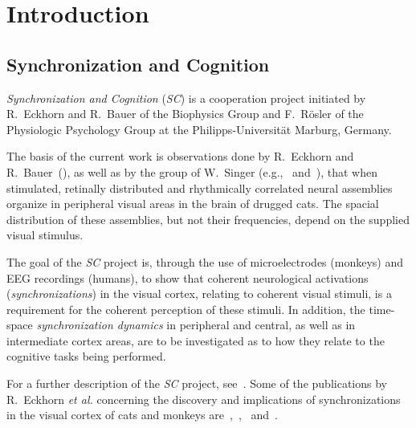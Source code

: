 
\chapter{Introduction}
\label{intro}

\section{Synchronization and Cognition}
\label{intro:synch}

{\em Synchronization and Cognition\/} ({\em SC\/}) is a cooperation
project initiated by R.\ Eckhorn and R.\ Bauer of the Biophysics Group
and F.\ R\"{o}sler of the Physiologic Psychology Group at the
Philipps-Universit\"{a}t Marburg, Germany.

The basis of the current work is observations done by R.\ Eckhorn and
R.\ Bauer~(\cite{cat}), as well as by the group of W.\ Singer
(e.g.,~\cite{singer2} and~\cite{singer1}), that when stimulated,
retinally distributed and rhythmically correlated neural assemblies
organize in peripheral visual areas in the brain of drugged cats.  The
spacial distribution of these assemblies, but not their frequencies,
depend on the supplied visual stimulus.

The goal of the {\em SC\/} project is, through the use of
microelectrodes (monkeys) and EEG recordings (humans), to show that
coherent neurological activations ({\em synchronizations\/}) in the
visual cortex, relating to coherent visual stimuli, is a requirement
for the coherent perception of these stimuli.  In addition, the
time-space {\em synchronization dynamics\/} in peripheral and central,
as well as in intermediate cortex areas, are to be investigated as to
how they relate to the cognitive tasks being performed.

For a further description of the {\em SC\/} project,
see~\cite{antrag}.  Some of the publications by R.\ Eckhorn {\em et
  al.\/} concerning the discovery and implications of synchronizations
in the visual cortex of cats and monkeys
are~\cite{eckhorn1},~\cite{eckhorn2},~\cite{cat} and~\cite{eckhorn3}.

